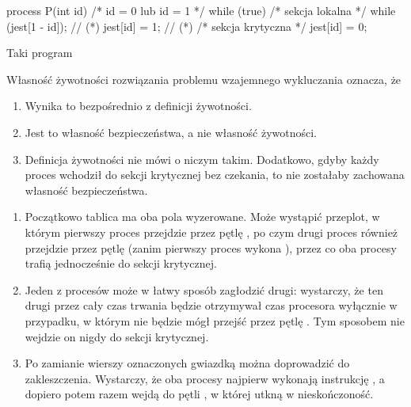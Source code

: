 \begin{solutions}
\begin{cpp}
        process P(int id) { /* id = 0 lub id = 1 */
            while (true) {
                /* sekcja lokalna */
                while (jest[1 - id]);        // (*)
                jest[id] = 1;                // (*)
                /* sekcja krytyczna */
                jest[id] = 0;
            }
        }
    \end{cpp}
    Taki program

    \sol Własność żywotności rozwiązania problemu wzajemnego wykluczania oznacza, że

    \begin{enumerate}[\bf A.]
        \item Wynika to bezpośrednio z definicji żywotności.

        \item Jest to własność bezpieczeństwa, a nie własność żywotności.

        \item Definicja żywotności nie mówi o niczym takim. Dodatkowo, gdyby każdy proces wchodził do sekcji krytycznej bez czekania, to nie zostałaby zachowana własność bezpieczeństwa.
    \end{enumerate}

    \begin{enumerate}[\bf A.]
        \item Początkowo tablica  ma oba pola wyzerowane. Może wystąpić przeplot, w którym pierwszy proces przejdzie przez pętlę , po czym drugi proces również przejdzie przez pętlę (zanim pierwszy proces wykona ), przez co oba procesy trafią jednocześnie do sekcji krytycznej.

        \item Jeden z procesów może w łatwy sposób zagłodzić drugi: wystarczy, że ten drugi przez cały czas trwania będzie otrzymywał czas procesora wyłącznie w przypadku, w którym nie będzie mógł przejść przez pętlę . Tym sposobem nie wejdzie on nigdy do sekcji krytycznej.

        \item Po zamianie wierszy oznaczonych gwiazdką można doprowadzić do zakleszczenia. Wystarczy, że oba procesy najpierw wykonają instrukcję , a dopiero potem razem wejdą do pętli , w której utkną w nieskończoność.
    \end{enumerate}


\end{solutions}
